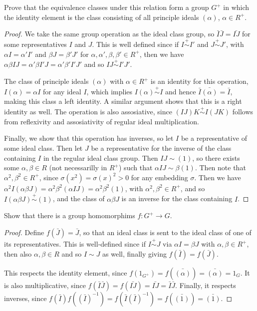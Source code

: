 \documentclass[11pt]{article}
\begin{document}
Prove that the equivalence classes under this relation form a group $G^+$ in which the identity element is the class consisting of all principle ideals $(\alpha)$, $\alpha \in R^+$.
\begin{proof}
  We take the same group operation as the ideal class group, so $\bar I \bar J = \bar{IJ}$ for some representatives $I$ and $J$.
  This is well defined since if $I \overset{+}{\sim} I'$ and $J \overset{+}{\sim} J'$, with $\alpha I = \alpha' I'$ and $\beta J = \beta' J'$ for $\alpha, \alpha', \beta, \beta' \in R^+$, then we have $\alpha \beta I J = \alpha' \beta I' J = \alpha' \beta' I' J'$ and so $IJ \overset{+}{\sim} I'J'$.

  The class of principle ideals $(\alpha)$ with $\alpha \in R^+$ is an identity for this operation, $I(\alpha) = \alpha I$ for any ideal $I$, which implies $I(\alpha) \overset{+}{\sim} I$ and hence $\bar I \bar{(\alpha)} = \bar I$, making this class a left identity.
  A similar argument shows that this is a right identity as well.
  The operation is also assosiative, since $(IJ)K \overset{+}{\sim} I(JK)$ follows from reflexivity and assosiativity of regular ideal multiplication.

  Finally, we show that this operation has inverses, so let $I$ be a representative of some ideal class.
  Then let $J$ be a representative for the inverse of the class containing $I$ in the regular ideal class group.
  Then $IJ \sim (1)$, so there exists some $\alpha, \beta \in R$ (not necessarilly in $R^+$) such that $\alpha IJ \sim \beta (1)$.
  Then note that $\alpha^2, \beta^2 \in R^+$, since $\sigma(x^2) = \sigma(x)^2 > 0$ for any embedding $\sigma$.
  Then we have $\alpha^2 I (\alpha\beta J) = \alpha^2\beta^2(\alpha IJ) = \alpha^2\beta^2(1)$, with $\alpha^2, \beta^2 \in R^+$, and so $I(\alpha\beta J) \overset{+}{\sim} (1)$, and the class of $\alpha \beta J$ is an inverse for the class containing $I$.
\end{proof}

Show that there is a group homomorphims $f : G^+ \rightarrow G$.
\begin{proof}
  Define $f(\bar J) = \bar J$, so that an ideal class is sent to the ideal class of one of its representatives.
  This is well-defined since if $I \overset{+}{\sim} J$ via $\alpha I = \beta J$ with $\alpha, \beta \in R^+$, then also $\alpha, \beta \in R$ and so $I \sim J$ as well, finally giving $f(\bar I) = f(\bar J)$.

  This respects the identity element, since $f(1_{G^+}) = f(\bar{(\alpha)}) = \bar{(\alpha)} = 1_G$.
  It is also multiplicative, since $f(\bar I \bar J) = f(\bar{IJ}) = \bar{IJ} = \bar I \bar J$.
  Finally, it respects inverses, since $f(\bar I)f((\bar I)^{-1}) = f(\bar I (\bar I)^{-1}) = f(\bar{(1)}) = \bar{(1)}$.
\end{proof}
\end{document}
